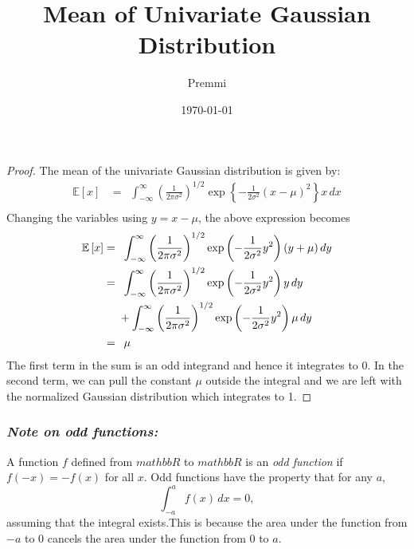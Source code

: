 \documentclass[14pt]{extarticle}
\title{Mean of Univariate Gaussian Distribution}
\author{Premmi}
\date{\today}
\begin{document}
    
\maketitle
\begin{flushleft}	
\begin{proof} 
The mean of the univariate Gaussian distribution is given by: 
\begin{align}
\mathbb{E}\left[x\right] &= \,\,\,\int_{-\infty}^{\infty} \left(\frac{1}{2\pi\sigma^2}\right)^{1/2}\exp\left\lbrace-\frac{1}{2\sigma^2}\left(x-\mu\right)^2\right\rbrace x\,dx\\
\end{align}  
Changing the variables using $y = x - \mu$, the above expression becomes
\begin{align}
\mathbb{E}\left[x\right] &= \,\,\,\int_{-\infty}^{\infty} \left(\frac{1}{2\pi\sigma^2}\right)^{1/2}\exp\left(-\frac{1}{2\sigma^2}y^2\right)\left(y+\mu\right)dy\\
&=\,\,\,\int_{-\infty}^{\infty} \left(\frac{1}{2\pi\sigma^2}\right)^{1/2}\exp\left(-\frac{1}{2\sigma^2}y^2\right)y\,dy \notag\\\ &\,\,\,\,\,\,\,\,+ \int_{-\infty}^{\infty} \left(\frac{1}{2\pi\sigma^2}\right)^{1/2}\exp\left(-\frac{1}{2\sigma^2}y^2\right)\mu\,dy\\
&= \,\,\,\mu
\end{align}
The first term in the sum is an odd integrand and hence it integrates to 0. In the second term, we can pull the constant $\mu$ outside the integral and we are left with the normalized Gaussian distribution which integrates to 1.
\end{proof}	
\subsubsection*{\textit{Note on odd functions:}}
A function $f$ defined from $mathbb{R}$ to $mathbb{R}$ is an \textit{odd function} if $f(-x) = -f(x)$ for all $x$. Odd functions have the property that for any $a$, $$\int_{-a}^{a}f(x)\,dx = 0,$$ assuming that the integral exists.This is because the area under the function from
$-a$ to 0 cancels the area under the function from 0 to $a$.


\end{flushleft}
\end{document}
